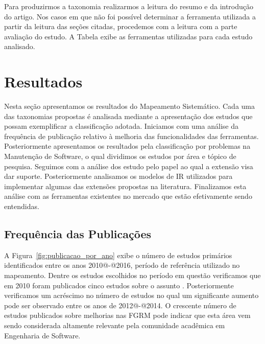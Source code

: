 Para produzirmos a taxonomia realizarmos a leitura do resumo e da introdução do
artigo. Nos casos em que não foi possível determinar a ferramenta utilizada a
partir da leitura das seções citadas, procedemos com a leitura com a parte
avaliação do estudo. A Tabela exibe as ferramentas utilizadas para cada estudo
analisado.

\section{Resultados}
\label{sec:resultados}

Nesta seção apresentamos os resultados do Mapeamento Sistemático. Cada uma das
taxonomias propostas é analisada mediante a apresentação dos estudos que possam
exemplificar a classificação adotada.  Iniciamos com uma análise da frequência
de publicação relativo à melhoria das funcionalidades das ferramentas.
Posteriormente apresentamos os resultados pela classificação por problemas na
Manutenção de Software, o qual dividimos os estudos por área e tópico de
pesquisa. Seguimos com a análise dos estudo pelo papel ao qual a extensão visa
dar suporte. Posteriormente analisamos os modelos de IR utilizados para
implementar algumas das extensões propostas na literatura. Finalizamos esta
análise com as ferramentas existentes no mercado que estão efetivamente sendo
entendidas.

\subsection{Frequência das Publicações}
\label{sub:frequencia_publicacao}

A Figura~\ref{fig:publicacao_por_ano} exibe o número de estudos primários
identificados entre os anos 2010@-@2016, período de referência utilizado no
mapeamento. Dentre os estudos escolhidos no período em questão verificamos que
em 2010 foram publicados cinco estudos sobre o assunto
\cite{sun2010discriminative,gegick2010identifying,song2010jdf,nagwani2010predictive,zimmermann2010makes}.
Posteriormente verificamos um acréscimo no número de estudos no qual um
significante aumento pode ser observado entre os anos de 2012@-@2014. O
crescente número de estudos publicados sobre melhorias nas FGRM pode indicar que
esta área vem sendo considerada altamente relevante pela comunidade acadêmica em
Engenharia de Software.


